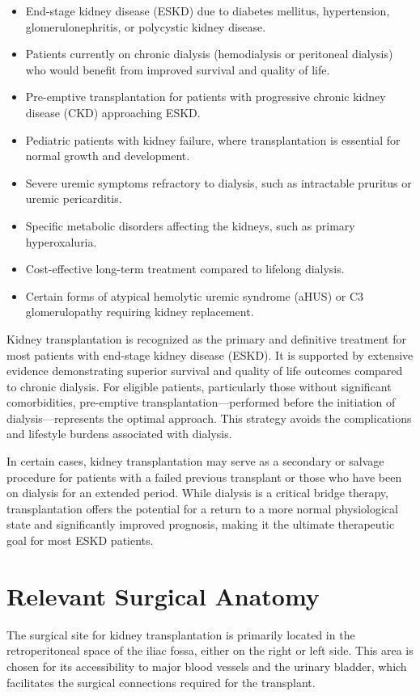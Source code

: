 \begin{itemize}
  \item End-stage kidney disease (ESKD) due to diabetes mellitus, hypertension, glomerulonephritis, or polycystic kidney disease.
  \item Patients currently on chronic dialysis (hemodialysis or peritoneal dialysis) who would benefit from improved survival and quality of life.
  \item Pre-emptive transplantation for patients with progressive chronic kidney disease (CKD) approaching ESKD.
  \item Pediatric patients with kidney failure, where transplantation is essential for normal growth and development.
  \item Severe uremic symptoms refractory to dialysis, such as intractable pruritus or uremic pericarditis.
  \item Specific metabolic disorders affecting the kidneys, such as primary hyperoxaluria.
  \item Cost-effective long-term treatment compared to lifelong dialysis.
  \item Certain forms of atypical hemolytic uremic syndrome (aHUS) or C3 glomerulopathy requiring kidney replacement.
\end{itemize}

Kidney transplantation is recognized as the primary and definitive treatment for most patients with end-stage kidney disease (ESKD). It is supported by extensive evidence demonstrating superior survival and quality of life outcomes compared to chronic dialysis. For eligible patients, particularly those without significant comorbidities, pre-emptive transplantation—performed before the initiation of dialysis—represents the optimal approach. This strategy avoids the complications and lifestyle burdens associated with dialysis.

In certain cases, kidney transplantation may serve as a secondary or salvage procedure for patients with a failed previous transplant or those who have been on dialysis for an extended period. While dialysis is a critical bridge therapy, transplantation offers the potential for a return to a more normal physiological state and significantly improved prognosis, making it the ultimate therapeutic goal for most ESKD patients.

\section*{Relevant Surgical Anatomy}
The surgical site for kidney transplantation is primarily located in the retroperitoneal space of the iliac fossa, either on the right or left side. This area is chosen for its accessibility to major blood vessels and the urinary bladder, which facilitates the surgical connections required for the transplant. 

